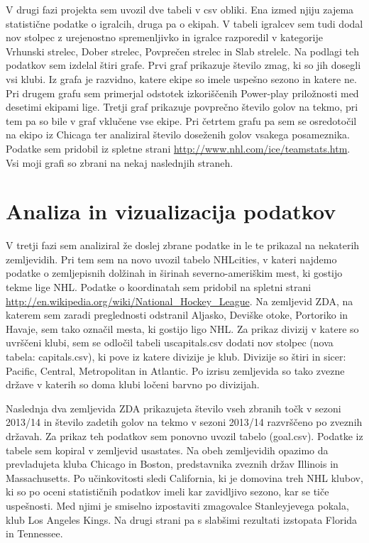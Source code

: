 \documentclass[11pt,a4paper]{article}
\begin{document}
V drugi fazi projekta sem uvozil dve tabeli v csv obliki. Ena izmed njiju zajema statistične podatke o igralcih, druga pa o ekipah. V tabeli igralcev sem tudi dodal nov stolpec z urejenostno spremenljivko in igralce razporedil v kategorije Vrhunski strelec, Dober strelec, Povprečen strelec in Slab strelelc. Na podlagi teh podatkov sem izdelal štiri grafe. Prvi graf prikazuje število zmag, ki so jih dosegli vsi klubi. Iz grafa je razvidno, katere ekipe so imele uspešno sezono in katere ne. Pri drugem grafu sem primerjal odstotek izkoriščenih Power-play priložnosti med desetimi ekipami lige. Tretji graf prikazuje povprečno število golov na tekmo, pri tem pa so bile v graf vklučene vse ekipe. Pri četrtem grafu pa sem se osredotočil na ekipo iz Chicaga ter analiziral število doseženih golov vsakega posameznika. Podatke sem pridobil iz spletne strani \url{http://www.nhl.com/ice/teamstats.htm}. Vsi moji grafi so zbrani na nekaj naslednjih straneh.





\section{Analiza in vizualizacija podatkov}

V tretji fazi sem analiziral že doslej zbrane podatke in le te prikazal na nekaterih zemljevidih. Pri tem sem na novo uvozil tabelo NHLcities, v kateri najdemo podatke o zemljepisnih dolžinah in širinah severno-ameriškim mest, ki gostijo tekme lige NHL. Podatke o koordinatah sem pridobil na spletni strani \url{http://en.wikipedia.org/wiki/National_Hockey_League}. Na zemljevid ZDA, na katerem sem zaradi preglednosti odstranil Aljasko, Deviške otoke, Portoriko in Havaje, sem tako označil mesta, ki gostijo ligo NHL.
Za prikaz divizij v katere so uvrščeni klubi, sem se odločil tabeli uscapitals.csv dodati nov stolpec (nova tabela: capitals.csv), ki pove iz katere divizije je klub. Divizije so štiri in sicer: Pacific, Central, Metropolitan in Atlantic. Po izrisu zemljevida so tako zvezne države v katerih so doma klubi ločeni barvno po divizijah. 

Naslednja dva zemljevida ZDA prikazujeta število vseh zbranih točk v sezoni 2013/14 in število zadetih golov na tekmo v sezoni 2013/14 razvrščeno po zveznih državah. Za prikaz teh podatkov sem ponovno uvozil tabelo (goal.csv). Podatke iz tabele sem kopiral v zemljevid usastates. Na obeh zemljevidih opazimo da prevladujeta kluba Chicago in Boston, predstavnika zveznih držav Illinois in Massachusetts. Po učinkovitosti sledi California, ki je domovina treh NHL klubov, ki so po oceni statističnih podatkov imeli kar zavidljivo sezono, kar se tiče uspešnosti. Med njimi je smiselno izpostaviti zmagovalce Stanleyjevega pokala, klub Los Angeles Kings. Na drugi strani pa s slabšimi rezultati izstopata Florida in Tennessee.
\end{document}
